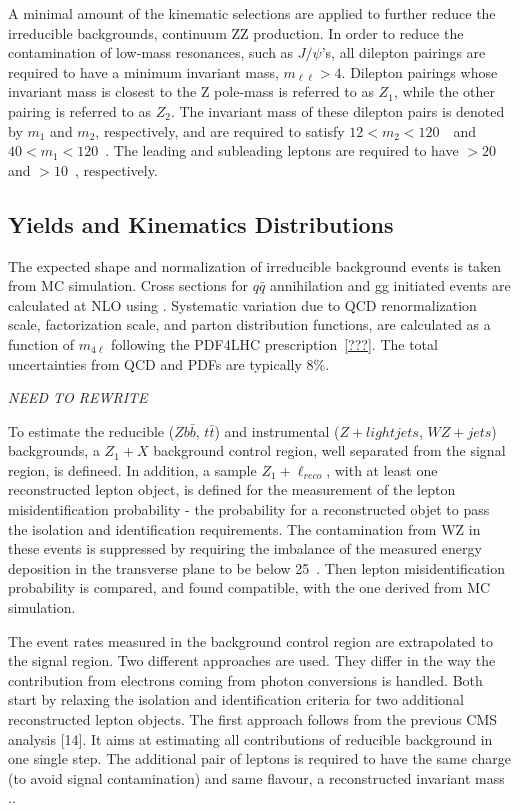 A minimal amount of the kinematic selections are applied to 
further reduce the irreducible backgrounds, continuum ZZ 
production.  In order to reduce the contamination of low-mass
resonances, such as $J/\psi$'s, all dilepton pairings are 
required to have a 
minimum invariant mass, $m_{\ell\ell}>4$\GeV.  Dilepton 
pairings whose invariant mass is closest to the Z pole-mass
is referred to as $Z_{1}$, while the other pairing is referred
to as $Z_{2}$.  The invariant mass of these dilepton pairs is 
denoted by $m_1$ and $m_2$, respectively, and are required
to satisfy $12<m_2<120$~\GeV~and $40<m_1<120$~\GeV.  The 
leading and subleading leptons are required to have
\pt$>20$ and \pt$>10$~\GeV, respectively.

\subsection{Yields and Kinematics Distributions}
\label{sec:HZZ4lyields}

The expected shape and normalization of irreducible 
background events is taken from MC simulation.  Cross sections
for $q\bar{q}$ annihilation and gg initiated events are 
calculated at NLO using \MCFM.  Systematic variation due to 
QCD renormalization scale, factorization scale, and parton 
distribution functions, are calculated as a function of $m_{4\ell}$
following the PDF4LHC prescription~\ref{???}. The total 
uncertainties from QCD and PDFs are typically 8\%.  

{\it NEED TO REWRITE}

To estimate the reducible ($Zb\bar{b}$, $t\bar{t}$) and 
instrumental ($Z+light jets$, $WZ+jets$) backgrounds, a 
$Z_1+X$ background control region, well separated from the 
signal region, is defineed.  In addition, a sample $Z_1+\ell_{reco}$,
with at least one reconstructed lepton object, is defined for the
measurement of the lepton misidentification probability - the
probability for a reconstructed objet to pass the isolation and 
identification requirements.  The contamination from WZ in these
events is suppressed by requiring the imbalance of the measured
energy deposition in the transverse plane to be below 25~\GeV. 
Then lepton misidentification probability is compared, and found
compatible, with the one derived from MC simulation.

The event rates measured in the background control region are
extrapolated to the signal region.  Two different approaches are
used.  They differ in the way the contribution from electrons
coming from photon conversions is handled.  Both start by 
relaxing the isolation and identification criteria for two 
additional reconstructed lepton objects.  The first approach 
follows from the previous CMS analysis [14].  It aims at
estimating all contributions of reducible background in one 
single step.  The additional pair of leptons is required to have
the same charge (to avoid signal contamination) and same flavour,
a reconstructed invariant mass .. 

